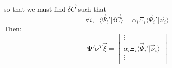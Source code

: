 \documentclass[aps,12pt]{revtex4}
\begin{document}
so that we must find $\delta\vec{C}$ such that:
\begin{equation}
		\forall i, \;\; \langle\vec{\Psi}_i' \vert \delta\vec{C} \rangle = \alpha_i \Xi_i \langle \vec{\Psi}_i' \vert \vec{\nu}_i \rangle
\end{equation}
Then:
\begin{equation}
	\bm{\Psi}' \bm{\nu}^T \vec{\xi} = 
	\begin{bmatrix}
	\vdots\\
	\alpha_i \Xi_i \langle \vec{\Psi}_i' \vert \vec{\nu}_i \rangle\\
	\vdots\\
	\end{bmatrix}
\end{equation}



 
\end{document}
